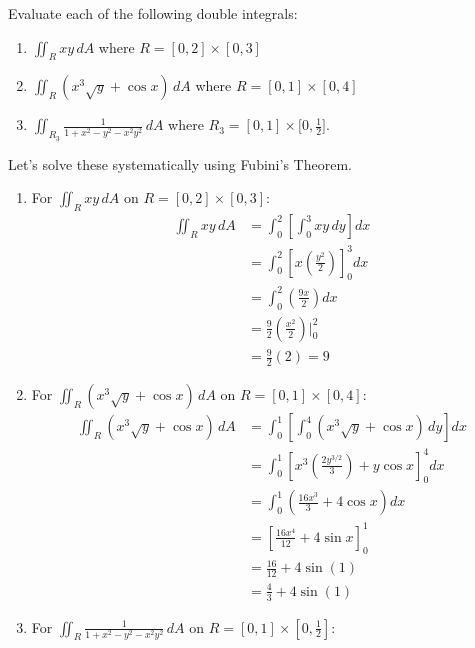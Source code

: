 \exampleline
\begin{example}
Evaluate each of the following double integrals:
\begin{enumerate}
   \item \(\displaystyle\iint_R xy \,dA\) where $R = [0,2] \times [0,3]$
   \item \(\displaystyle\iint_R (x^3\sqrt{y} + \cos x) \,dA\) where $R = [0,1] \times [0,4]$
   \item \(\displaystyle \iint_{R_3} \frac{1}{1 + x^2 - y^2 - x^2 y^2}\,dA\) where \(R_3 = [0,1]\times\bigl[0,\tfrac12\bigr].\)
\end{enumerate}

\begin{solution}
Let's solve these systematically using Fubini's Theorem.

\begin{enumerate}
\item For \(\displaystyle\iint_R xy \,dA\) on $R = [0,2] \times [0,3]$:
\begin{align*}
\iint_R xy \,dA &= \int_0^2 \left[\int_0^3 xy \,dy\right] dx \\
&= \int_0^2 \left[x\left(\frac{y^2}{2}\right)\right]_0^3 dx \\
&= \int_0^2 \left(\frac{9x}{2}\right) dx \\
&= \frac{9}{2}\left(\frac{x^2}{2}\right)\bigg|_0^2 \\
&= \frac{9}{2}(2) = 9
\end{align*}

\item For \(\displaystyle\iint_R (x^3\sqrt{y} + \cos x) \,dA\) on $R = [0,1] \times [0,4]$:
\begin{align*}
\iint_R (x^3\sqrt{y} + \cos x) \,dA &= \int_0^1 \left[\int_0^4 (x^3\sqrt{y} + \cos x) \,dy\right] dx \\
&= \int_0^1 \left[x^3\left(\frac{2y^{3/2}}{3}\right) + y\cos x\right]_0^4 dx \\
&= \int_0^1 \left(\frac{16x^3}{3} + 4\cos x\right) dx \\
&= \left[\frac{16x^4}{12} + 4\sin x\right]_0^1 \\
&= \frac{16}{12} + 4\sin(1) \\
&= \frac{4}{3} + 4\sin(1)
\end{align*}

\item For \(\displaystyle\iint_R \frac{1}{1 + x^2 - y^2 - x^2y^2} \,dA\) on $R = [0,1] \times [0,\frac{1}{2}]$:


\end{enumerate}
\end{solution}
\end{example}
